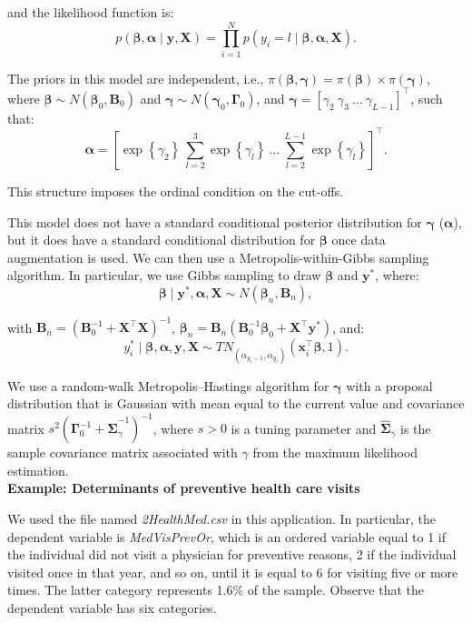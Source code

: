 and the likelihood function is:
\[
p(\bm{\beta}, \bm{\alpha} \mid \bm{y}, \bm{X}) = \prod_{i=1}^{N} p(y_i = l \mid \bm{\beta}, \bm{\alpha}, \bm{X}).
\]

The priors in this model are independent, i.e., $\pi(\bm{\beta}, \bm{\gamma}) = \pi(\bm{\beta}) \times \pi(\bm{\gamma})$, where $\bm{\beta} \sim N(\bm{\beta}_0, \bm{B}_0)$ and $\bm{\gamma} \sim N(\bm{\gamma}_0, \bm{\Gamma}_0)$, and $\bm{\gamma} = \left[ \gamma_2 \ \gamma_3 \ \dots \ \gamma_{L-1} \right]^{\top}$, such that:
\[
\bm{\alpha} = \left[ \exp\left\{\gamma_2\right\} \ \sum_{l=2}^{3} \exp\left\{\gamma_l\right\} \ \dots \ \sum_{l=2}^{L-1} \exp\left\{\gamma_l\right\} \right]^{\top}.
\]

This structure imposes the ordinal condition on the cut-offs.

This model does not have a standard conditional posterior distribution for $\bm{\gamma}$ ($\bm{\alpha}$), but it does have a standard conditional distribution for $\bm{\beta}$ once data augmentation is used. We can then use a Metropolis-within-Gibbs sampling algorithm. In particular, we use Gibbs sampling to draw $\bm{\beta}$ and $\bm{y}^*$, where:
\[
\bm{\beta} \mid \bm{y}^*, \bm{\alpha}, \bm{X} \sim N(\bm{\beta}_n, \bm{B}_n),
\]

with $\bm{B}_n = (\bm{B}_0^{-1} + \bm{X}^{\top}\bm{X})^{-1}$, $\bm{\beta}_n = \bm{B}_n(\bm{B}_0^{-1}\bm{\beta}_0 + \bm{X}^{\top}\bm{y}^*)$, and:
\[
y_i^* \mid \bm{\beta}, \bm{\alpha}, \bm{y}, \bm{X} \sim TN_{(\alpha_{y_i-1}, \alpha_{y_i})}(\bm{x}_i^{\top}\bm{\beta}, 1).
\]

We use a random-walk Metropolis--Hastings algorithm for $\bm{\gamma}$ with a proposal distribution that is Gaussian with mean equal to the current value and covariance matrix $s^2(\bm{\Gamma}_0^{-1} + \hat{\bm{\Sigma}}_{\gamma}^{-1})^{-1}$, where $s > 0$ is a tuning parameter and $\hat{\bm{\Sigma}}_{\gamma}$ is the sample covariance matrix associated with $\gamma$ from the maximum likelihood estimation.\\

\textbf{Example: Determinants of preventive health care visits}

We used the file named \textit{2HealthMed.csv} in this application. In particular, the dependent variable is \textit{MedVisPrevOr}, which is an ordered variable equal to 1 if the individual did not visit a physician for preventive reasons, 2 if the individual visited once in that year, and so on, until it is equal to 6 for visiting five or more times. The latter category represents 1.6\% of the sample. Observe that the dependent variable has six categories.

